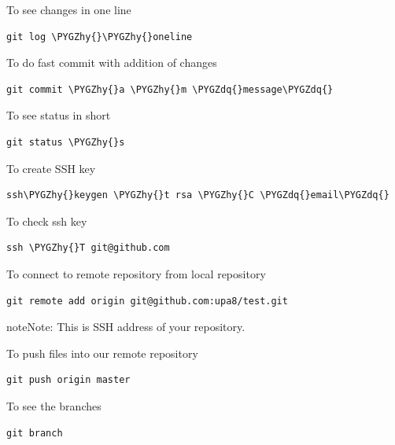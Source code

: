 \documentclass[letterpaper,10pt,english]{sphinxmanual}
\def\PYGZhy{\char`\-}
\def\PYGZdq{\char`\"}
\begin{document}
To see changes in one line

\begin{Verbatim}[commandchars=\\\{\}]
git log \PYGZhy{}\PYGZhy{}oneline
\end{Verbatim}

To do fast commit with addition of changes

\begin{Verbatim}[commandchars=\\\{\}]
git commit \PYGZhy{}a \PYGZhy{}m \PYGZdq{}message\PYGZdq{}
\end{Verbatim}

To see status in short

\begin{Verbatim}[commandchars=\\\{\}]
git status \PYGZhy{}s
\end{Verbatim}

To create SSH key

\begin{Verbatim}[commandchars=\\\{\}]
ssh\PYGZhy{}keygen \PYGZhy{}t rsa \PYGZhy{}C \PYGZdq{}email\PYGZdq{}
\end{Verbatim}

To check ssh key

\begin{Verbatim}[commandchars=\\\{\}]
ssh \PYGZhy{}T git@github.com
\end{Verbatim}

To connect to remote repository from local repository

\begin{Verbatim}[commandchars=\\\{\}]
git remote add origin git@github.com:upa8/test.git
\end{Verbatim}

\begin{notice}{note}{Note:}
This is SSH address of your repository.
\end{notice}

To push files into our remote repository

\begin{Verbatim}[commandchars=\\\{\}]
git push origin master
\end{Verbatim}

To see the branches

\begin{Verbatim}[commandchars=\\\{\}]
git branch
\end{Verbatim}
\end{document}
